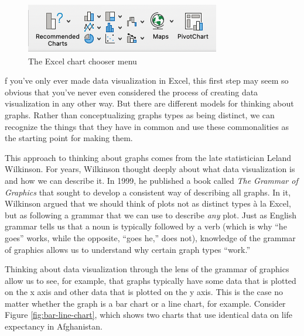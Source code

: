 \documentclass[
]{book}
\begin{document}
\begin{figure}
\includegraphics[width=1\linewidth]{assets/excel-chart-chooser} \caption{The Excel chart chooser menu}\label{fig:excel-chart-chooser}
\end{figure}

f you've only ever made data visualization in Excel, this first step may seem so obvious that you've never even considered the process of creating data visualization in any other way. But there are different models for thinking about graphs. Rather than conceptualizing graphs types as being distinct, we can recognize the things that they have in common and use these commonalities as the starting point for making them.

This approach to thinking about graphs comes from the late statistician Leland Wilkinson. For years, Wilkinson thought deeply about what data visualization is and how we can describe it. In 1999, he published a book called \emph{The Grammar of Graphics} that sought to develop a consistent way of describing all graphs. In it, Wilkinson argued that we should think of plots not as distinct types à la Excel, but as following a grammar that we can use to describe \emph{any} plot. Just as English grammar tells us that a noun is typically followed by a verb (which is why ``he goes'' works, while the opposite, ``goes he,'' does not), knowledge of the grammar of graphics allows us to understand why certain graph types ``work.''

Thinking about data visualization through the lens of the grammar of graphics allow us to see, for example, that graphs typically have some data that is plotted on the x axis and other data that is plotted on the y axis. This is the case no matter whether the graph is a bar chart or a line chart, for example. Consider Figure \ref{fig:bar-line-chart}, which shows two charts that use identical data on life expectancy in Afghanistan.
\end{document}
